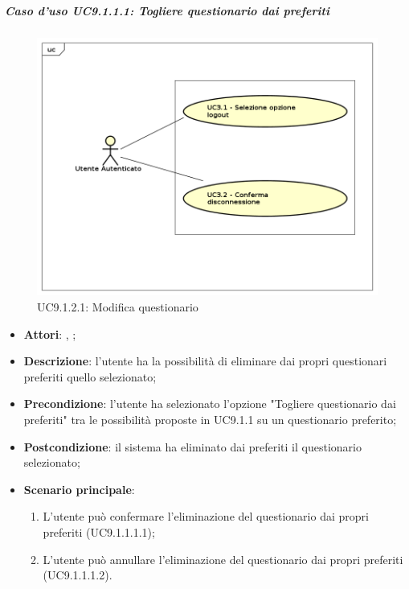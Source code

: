 			\subparagraph{Caso d'uso UC9.1.1.1: Togliere questionario dai preferiti}
			\label{UC9.1.1.1}
			\begin{figure}[h]
				\centering
				\includegraphics[scale=0.7,keepaspectratio]{UML/UC9.png}
				\caption{UC9.1.2.1: Modifica questionario}
			\end{figure}
			\FloatBarrier
			\begin{itemize}
				\item \textbf{Attori}: \uau, \uaupro;
				\item \textbf{Descrizione}: l'utente ha la possibilità di eliminare dai propri questionari preferiti quello selezionato;
				\item \textbf{Precondizione}: l'utente ha selezionato l'opzione "Togliere questionario dai preferiti" tra le possibilità proposte in UC9.1.1 su un questionario preferito;
				\item \textbf{Postcondizione}: il sistema ha eliminato dai preferiti il questionario selezionato;
				\item \textbf{Scenario principale}: 
					\begin{enumerate}
						\item L'utente può confermare l'eliminazione del questionario dai propri preferiti (UC9.1.1.1.1);
						\item L'utente può annullare l'eliminazione del questionario dai propri preferiti (UC9.1.1.1.2).
					\end{enumerate}
			\end{itemize}
				
